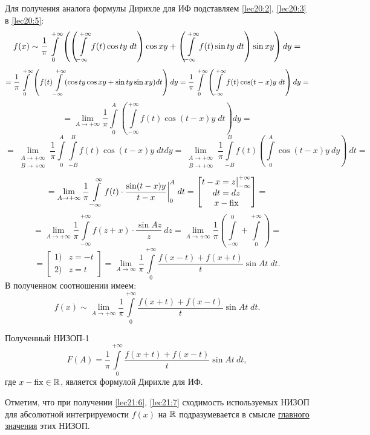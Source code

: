 \documentclass[../../main.tex]{subfiles}
\begin{document}
Для получения аналога формулы Дирихле для ИФ подставляем
\eqref{lec20:2}, \eqref{lec20:3} в \eqref{lec20:5}:
\[
f(x) \sim \dfrac{1}{\pi} \int\limits_{0}^{+\infty}
\left(
\left(\int\limits_{-\infty}^{+\infty} f(t) \cos ty\;dt\right) \cos xy +
\left(
\int\limits_{-\infty}^{+\infty} f(t) \sin ty\;dt
\right) \sin xy 
\right) dy = \] \[ =
\dfrac{1}{\pi}
\int\limits_{0}^{+\infty} \left( f(t)
\int\limits_{-\infty}^{+\infty} (\cos ty\cos xy + \sin ty\sin xy) dt
\right) dy =
\dfrac{1}{\pi} \int\limits_{0}^{+\infty} \left(
\int\limits_{-\infty}^{+\infty} f(t) \cos(t - x)y\;dt
\right) dy = \] \[ =
\lim\limits_{A \to +\infty} \dfrac{1}{\pi}
\int\limits_0^{A} \left(
\int\limits_{-\infty}^{+\infty}
f(t) \cos(t - x)y\;dt
\right) dy =
\] \[ = 
\lim\limits_{\substack{A \to +\infty \\ B \to +\infty}} \dfrac{1}{\pi}
\int\limits_0^A \int\limits_{-B}^B f(t) \cos(t-x)y\;dtdy =
\lim\limits_{\substack{A \to +\infty \\ B \to +\infty}}
\dfrac{1}{\pi} \int\limits_{-B}^B f(t) \left(
\int\limits_0^A
 \cos (t - x) y\ dy \right)\ dt =
\] \[ = 
\lim\limits_{A \to +\infty} \dfrac{1}{\pi}
\int\limits_{-\infty}^{\infty} f(t) \cdot
\dfrac{\sin (t - x)y}{t - x}\bigg|_0^A\;dt = 
\begin{bmatrix}
t - x = z \big|_{-\infty}^{+\infty}\\
dt = dz \\
x - \operatorname{fix}
\end{bmatrix} =
\] \[ = 
\lim\limits_{A \to +\infty} \dfrac{1}{\pi} 
\int\limits_{-\infty}^{+\infty} f(z + x)\cdot
\dfrac{\sin Az}{z}\ dz =
\lim\limits_{A \to +\infty} \dfrac{1}{\pi}
\left(
\int\limits_{-\infty}^{0} + 
\int\limits_{0}^{+\infty}
\right) =
\] \[ = 
\begin{bmatrix}
1)& z = -t \\
2)& z = t
\end{bmatrix} =
\lim\limits_{A \to \infty} \dfrac{1}{\pi}
\int\limits_{0}^{+\infty}
\dfrac{f(x - t) + f(x + t)}{t} \sin At\;dt.
\]
В полученном соотношении имеем:
\begin{equation}
\label{lec21:6}
	f(x) \sim \lim\limits_{A \to +\infty} \dfrac{1}{\pi} 
	\int\limits_0^{+\infty} \dfrac{f(x + t) + f(x - t)}{t} \sin At\;dt.
\end{equation}

Полученный НИЗОП-1
\begin{equation}
\label{lec21:7}
	F(A) = \dfrac{1}{\pi} \int\limits_0^{+\infty} 
	\dfrac{f(x + t) + f(x - t)}{t} \sin At\ dt,
\end{equation}
где $ x - \operatorname{fix} \in \mathbb{R} $, является формулой Дирихле для ИФ.

Отметим, что при получении \eqref{lec21:6}, \eqref{lec21:7}
сходимость используемых НИЗОП для абсолютной интегрируемости $f(x)$ на
$\mathbb{R}$ подразумевается в смысле \underline{главного значения} этих НИЗОП.
\end{document}
